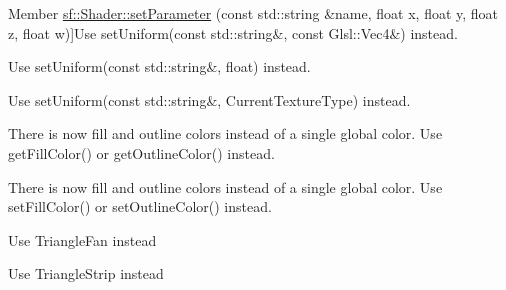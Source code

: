 \begin{DoxyRefList}
\hypertarget{deprecated__deprecated000009}{}%
Member \hyperlink{classsf_1_1_shader_a6d6b84575a5f1a869d70a126df8d6478}{sf\-:\-:Shader\-:\-:set\-Parameter} (const std\-::string \&name, float x, float y, float z, float w)]Use set\-Uniform(const std\-::string\&, const Glsl\-::\-Vec4\&) instead. 
\item[\label{deprecated__deprecated000006}%
\hypertarget{deprecated__deprecated000006}{}%
Member \hyperlink{classsf_1_1_shader_a4d6ec78f6de1a0a2146c93ab09d7d762}{sf\-:\-:Shader\-:\-:set\-Parameter} (const std\-::string \&name, float x)]Use set\-Uniform(const std\-::string\&, float) instead. 
\item[\label{deprecated__deprecated000015}%
\hypertarget{deprecated__deprecated000015}{}%
Member \hyperlink{classsf_1_1_shader_a0fa7ecad14206e4d5edae1d6aa87f553}{sf\-:\-:Shader\-:\-:set\-Parameter} (const std\-::string \&name, Current\-Texture\-Type)]Use set\-Uniform(const std\-::string\&, Current\-Texture\-Type) instead. 
\item[\label{deprecated__deprecated000017}%
\hypertarget{deprecated__deprecated000017}{}%
Member \hyperlink{classsf_1_1_text_a0fdc0ff583835760fa44509d1cdd23ff}{sf\-:\-:Text\-:\-:get\-Color} () const ]There is now fill and outline colors instead of a single global color. Use get\-Fill\-Color() or get\-Outline\-Color() instead. 
\item[\label{deprecated__deprecated000016}%
\hypertarget{deprecated__deprecated000016}{}%
Member \hyperlink{classsf_1_1_text_a6ce65272d6d63ed01118366e92c68132}{sf\-:\-:Text\-:\-:set\-Color} (const Color \&color)]There is now fill and outline colors instead of a single global color. Use set\-Fill\-Color() or set\-Outline\-Color() instead. 
\item[\label{deprecated__deprecated000004}%
\hypertarget{deprecated__deprecated000004}{}%
Member \hyperlink{group__graphics_gga5ee56ac1339984909610713096283b1ba698ecd8ec938b4132412b8da44a1a6be}{sf\-:\-:Triangles\-Fan} ]Use Triangle\-Fan instead  
\item[\label{deprecated__deprecated000003}%
\hypertarget{deprecated__deprecated000003}{}%
Member \hyperlink{group__graphics_gga5ee56ac1339984909610713096283b1baf5ef0ffa5d13f9ea3e0eb18a2a8da7fb}{sf\-:\-:Triangles\-Strip} ]Use Triangle\-Strip instead 
\end{DoxyRefList}